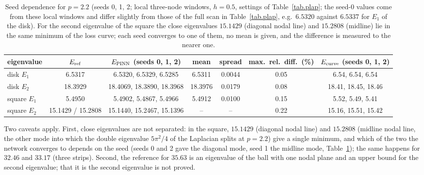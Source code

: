 \documentclass[10pt]{amsart}
\newenvironment{revblock}{\color{blue}}{}
\theoremstyle{definition}
\theoremstyle{remark}
\theoremstyle{plain}
\begin{document}
\begin{revblock}
\begin{table}[tbp]
\centering\small
\color{blue}
\caption{Seed dependence for $p=2.2$ (seeds 0, 1, 2; local three-node windows, $h=0.5$, settings of Table~\ref{tab.plap}; the seed-0 values come from these local windows and differ slightly from those of the full scan in Table~\ref{tab.plap}, e.g.\ $6.5320$ against $6.5337$ for $E_1$ of the disk). For the second eigenvalue of the square the close eigenvalues $15.1429$ (diagonal nodal line) and $15.2808$ (midline) lie in the same minimum of the loss curve; each seed converges to one of them, no mean is given, and the difference is measured to the nearer one.}
\label{tab.plap.seeds}
\setlength{\tabcolsep}{4pt}
\begin{tabular}{lcccccc}
\toprule
eigenvalue & $E_{\rm ref}$ & $E_{\rm PINN}$ (seeds 0, 1, 2) & mean & spread & max.\ rel.\ diff.\ (\%) & $E_{\rm curve}$ (seeds 0, 1, 2)\\
\midrule
disk $E_1$ & 6.5317 & 6.5320, 6.5329, 6.5285 & 6.5311 & 0.0044 & 0.05 & 6.54, 6.54, 6.54\\
disk $E_2$ & 18.3929 & 18.4069, 18.3890, 18.3968 & 18.3976 & 0.0179 & 0.08 & 18.41, 18.45, 18.46\\
square $E_1$ & 5.4950 & 5.4902, 5.4867, 5.4966 & 5.4912 & 0.0100 & 0.15 & 5.52, 5.49, 5.41\\
square $E_2$ & 15.1429 / 15.2808 & 15.1440, 15.2467, 15.1396 & -- & -- & 0.22 & 15.16, 15.51, 15.42\\
\bottomrule
\end{tabular}
\end{table}

Two caveats apply. First, close eigenvalues are not separated: in the square, $15.1429$ (diagonal
nodal line) and $15.2808$ (midline nodal line, the other mode into which the double eigenvalue
$5\pi^2/4$ of the Laplacian splits at $p=2.2$) give a single minimum, and which of the two the network
converges to depends on the seed (seeds 0 and 2 gave the diagonal mode, seed 1 the midline mode, Table~\ref{tab.plap.seeds}); the same
happens for $32.46$ and $33.17$ (three strips). Second, the reference for $35.63$ is an eigenvalue of
the ball with one nodal plane and an upper bound for the second eigenvalue; that it is the second
eigenvalue is not proved.


\end{revblock}
\end{document}
